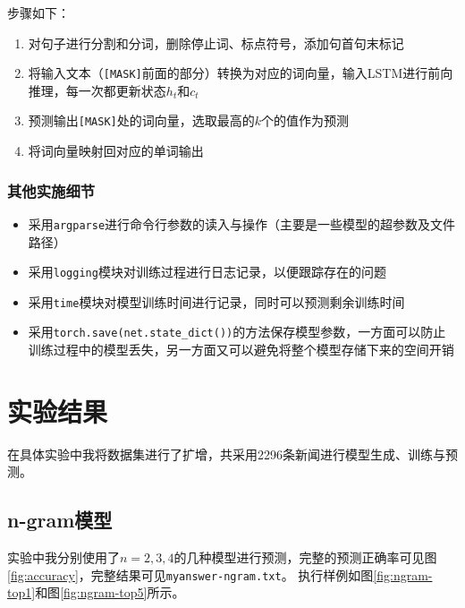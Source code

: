 \documentclass[logo,reportComp]{thesis}
\begin{document}
步骤如下：
\begin{enumerate}
\item 对句子进行分割和分词，删除停止词、标点符号，添加句首句末标记
\item 将输入文本（\verb'[MASK]'前面的部分）转换为对应的词向量，输入LSTM进行前向推理，每一次都更新状态$h_t$和$c_t$
\item 预测输出\verb'[MASK]'处的词向量，选取最高的$k$个的值作为预测
\item 将词向量映射回对应的单词输出
\end{enumerate}

\subsubsection{其他实施细节}
\begin{itemize}
    \item 采用\verb'argparse'进行命令行参数的读入与操作（主要是一些模型的超参数及文件路径）
    \item 采用\verb'logging'模块对训练过程进行日志记录，以便跟踪存在的问题
    \item 采用\verb'time'模块对模型训练时间进行记录，同时可以预测剩余训练时间
    \item 采用\verb'torch.save(net.state_dict())'的方法保存模型参数，一方面可以防止训练过程中的模型丢失，另一方面又可以避免将整个模型存储下来的空间开销
\end{itemize}

\section{实验结果}

在具体实验中我将数据集进行了扩增，共采用2296条新闻进行模型生成、训练与预测。

\subsection{n-gram模型}
\label{sub:n-gram}
实验中我分别使用了$n=2,3,4$的几种模型进行预测，完整的预测正确率可见图\ref{fig:accuracy}，完整结果可见\verb'myanswer-ngram.txt'。
执行样例如图\ref{fig:ngram-top1}和图\ref{fig:ngram-top5}所示。
\end{document}
